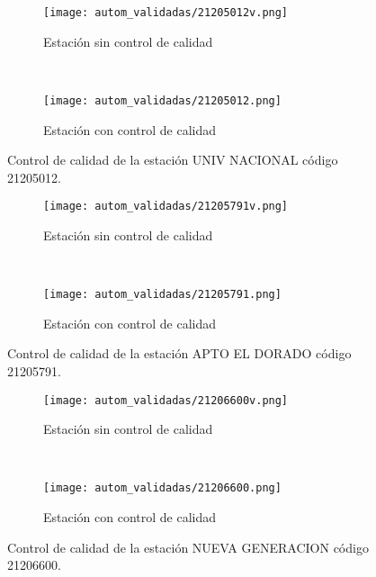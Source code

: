 \begin{figure}[H]
\begin{subfigure}[b]{0.5\textwidth}
\begin{center}
\texttt{[image: autom\_validadas/21205012v.png]}
\caption{Estación sin control de calidad}
        \end{center}
\end{subfigure}
~
\begin{subfigure}[b]{0.5\textwidth}
\begin{center}
\texttt{[image: autom\_validadas/21205012.png]}
\caption{Estación con control de calidad}
\end{center}    
\end{subfigure}
\caption{Control de calidad de la estación UNIV NACIONAL código 21205012.}
\end{figure}    
  
\begin{figure}[H]
\begin{subfigure}[b]{0.5\textwidth}
\begin{center}
\texttt{[image: autom\_validadas/21205791v.png]}
\caption{Estación sin control de calidad}
        \end{center}
\end{subfigure}
~
\begin{subfigure}[b]{0.5\textwidth}
\begin{center}
\texttt{[image: autom\_validadas/21205791.png]}
\caption{Estación con control de calidad}
\end{center}    
\end{subfigure}
\caption{Control de calidad de la estación APTO EL DORADO código 21205791.}
\end{figure}    
  
\begin{figure}[H]
\begin{subfigure}[b]{0.5\textwidth}
\begin{center}
\texttt{[image: autom\_validadas/21206600v.png]}
\caption{Estación sin control de calidad}
        \end{center}
\end{subfigure}
~
\begin{subfigure}[b]{0.5\textwidth}
\begin{center}
\texttt{[image: autom\_validadas/21206600.png]}
\caption{Estación con control de calidad}
\end{center}    
\end{subfigure}
\caption{Control de calidad de la estación NUEVA GENERACION código 21206600.}
\end{figure}    
  
